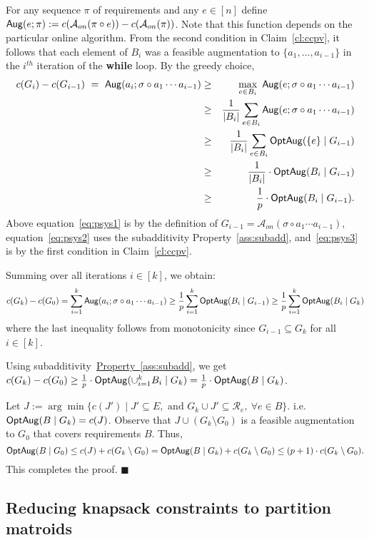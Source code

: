 \documentclass[11pt,letterpaper]{article}
\newcommand{\lref}[2][]{\hyperref[#2]{#1~\ref*{#2}}}
\newenvironment{proof}{

\noindent{\bf Proof:}} {\hfill$\blacksquare$


}
\def\a{\ensuremath{\mathcal{A}}\xspace}
\def\aug{{\sf Aug}}
\newcommand{\sse}{\subseteq}
\newcommand{\optaug}{{\sf OptAug}}
\begin{document}
\begin{proof}
For any sequence $\pi$ of requirements and any $e\in [n]$ define $\aug(e;\pi):=c(\a_{on}(\pi\circ e))-
c(\a_{on}(\pi))$. Note that this function depends on the particular online algorithm. From the second condition in
Claim~\ref{cl:ccpv}, it follows that each element of $B_i$ was a feasible augmentation to $\{a_1,\ldots,a_{i-1}\}$ in
the $i^{th}$ iteration of the {\bf while} loop. By the greedy choice,
\begin{eqnarray}
c(G_i)-c(G_{i-1}) ~=~    \aug(a_i; \sigma \circ a_1\cdots a_{i-1}) & \ge & \max_{e\in B_i}~ \aug(e; \sigma \circ a_1\cdots a_{i-1})\notag\\
    & \ge &\frac{1}{|B_i|}\sum_{e\in B_i} \aug(e; \sigma \circ a_1\cdots a_{i-1})\notag\\
    &\ge & \frac{1}{|B_i|} \sum_{e\in B_i} \optaug(\{e\}\mid G_{i-1}) \label{eq:psys1}\\
    &\ge & \frac{1}{|B_i|} \cdot \optaug(B_i\mid G_{i-1})\label{eq:psys2}\\
    &\ge & \frac{1}{p} \cdot \optaug(B_i\mid G_{i-1}).\label{eq:psys3}
\end{eqnarray}
Above equation~\eqref{eq:psys1} is by the definition of $G_{i-1}= \a_{on}(\sigma \circ a_1\cdots a_{i-1})$,
equation~\eqref{eq:psys2} uses the subadditivity Property~\ref{ass:subadd}, and~\eqref{eq:psys3} is by the first
condition in Claim~\ref{cl:ccpv}.

Summing over all iterations $i\in [k]$, we obtain:
$$c(G_k)- c(G_0)= \sum_{i=1}^k \aug(a_i; \sigma \circ a_1\cdots a_{i-1}) \ge \frac{1}{p} \sum_{i=1}^k
  \optaug(B_i\mid G_{i-1})\ge \frac{1}{p} \sum_{i=1}^k \optaug(B_i\mid G_k)$$ where the last inequality follows from monotonicity since
  $G_{i-1}\sse G_k$ for all $i\in [k]$.

Using subadditivity~\lref[Property]{ass:subadd}, we get $c(G_k)- c(G_0)
  \ge \frac1p \cdot \optaug(\cup_{i=1}^k B_i\mid G_k) = \frac1p \cdot \optaug(B\mid G_k)$.

Let $J:= \arg\min \{c(J')\mid J'\sse E, \mbox{ and }G_k\cup J'\sse
  \mathcal{R}_e,~\forall e\in B\}$. i.e.  $\optaug(B\mid G_k)=c(J)$. Observe that
$J\cup (G_k\setminus G_0)$ is a feasible  augmentation to $G_0$ that covers requirements $B$. Thus,
$$\optaug(B\mid G_0) \le c(J) + c(G_k\setminus G_0) = \optaug(B\mid G_k) + c(G_k\setminus G_0) \le (p+1)\cdot c(G_k\setminus
G_0).$$ This completes the proof.
\end{proof}

\subsection{Reducing knapsack constraints to partition matroids}
\label{sec:knapsack-mat}
\end{document}
